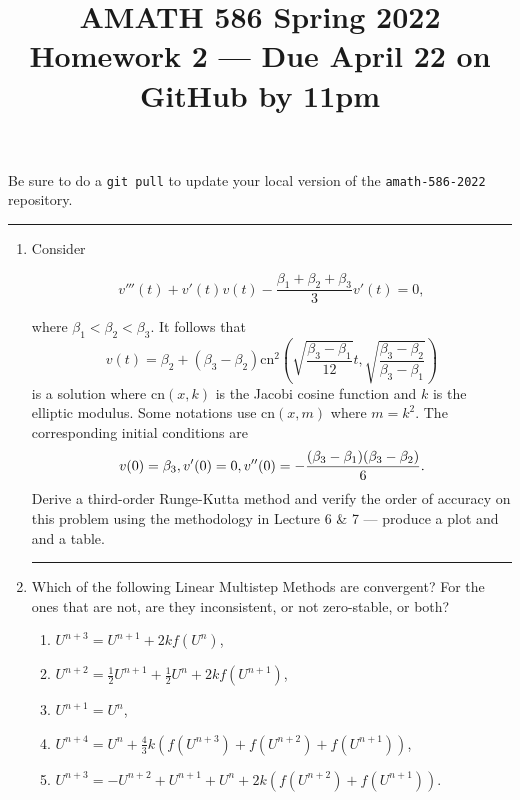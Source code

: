 \documentclass[10pt]{amsart}
\newcommand{\half}{\frac{1}{2}}
\newcommand\unp{U^{n+1}}
\begin{document}
\pagestyle{empty}

\newcommand{\mline}{\vspace{.2in}\hrule\vspace{.2in}}


\title{\bf { AMATH 586 Spring 2022 \\ Homework 2 ---
Due April 22 on GitHub by 11pm} }
\maketitle
\centerline{Be sure to do a {\tt git pull} to update your local version of the {\tt amath-586-2022} repository.}

\mline
\begin{enumerate}[label={\bf Problem~{\arabic*}:}]
  \item Consider

$$ v'''(t) + v'(t) v(t) - \frac{\beta_1 + \beta_2 + \beta_3}{3} v'(t) =0, $$

where $\beta_1 < \beta_2 < \beta_3$.  It follows that
$$
v(t) = \beta_2 + (\beta_3 - \beta_2) \mathrm{cn}^2\left( \sqrt{ \frac{\beta_3 - \beta_1}{12}} t, \sqrt{\frac{\beta_3 - \beta_2}{\beta_3 - \beta_1}} \right)
$$
is a solution where $\mathrm{cn}(x,k)$ is the Jacobi cosine function and $k$ is the elliptic modulus.  Some notations use $\mathrm{cn}(x,m)$ where $m = k^2$.  The corresponding initial conditions are
$$
v(0) = \beta_3, \\
v'(0) = 0,\\
v''(0) = -\frac{(\beta_3 - \beta_1)(\beta_3-\beta_2)}{6}.$$
Derive a third-order Runge-Kutta method and verify the order of accuracy on this problem using the methodology in Lecture 6 \& 7 --- produce a plot and and a table.
\mline
\item  Which of the following Linear Multistep Methods are convergent?  For 
the ones that are not, are they inconsistent, or not zero-stable, or both?
 \begin{enumerate}
 \item $U^{n+3} = U^{n+1} + 2kf(U^n)$,
 \item $U^{n+2} = \half U^{n+1} + \half U^{n} + 2kf(U^{n+1})$,
 \item $\unp = U^n$, 
 \item $U^{n+4} = U^{n} + \frac 4 3 k(f(U^{n+3})+f(U^{n+2})+f(U^{n+1}))$,
 \item $U^{n+3} = -U^{n+2} + U^{n+1} +U^{n}+2k(f(U^{n+2})+f(U^{n+1}))$.
 \end{enumerate}


\end{enumerate}
\end{document}

